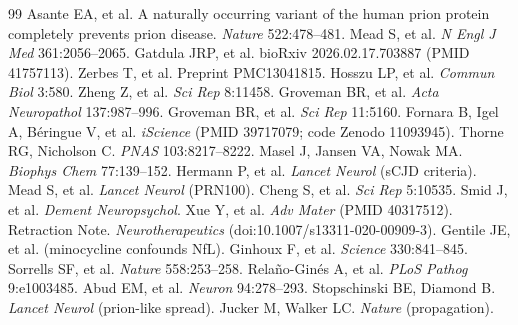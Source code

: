 \documentclass[10pt,twocolumn]{article}
\begin{document}
\begin{thebibliography}{99}\bibsep=1pt\tiny
{} Asante EA, et al. A naturally occurring variant of the human prion protein completely prevents prion disease. \emph{Nature} 522:478--481.
 Mead S, et al. \emph{N Engl J Med} 361:2056--2065.
 Gatdula JRP, et al. bioRxiv 2026.02.17.703887 (PMID 41757113).
 Zerbes T, et al. Preprint PMC13041815.
 Hosszu LP, et al. \emph{Commun Biol} 3:580.
 Zheng Z, et al. \emph{Sci Rep} 8:11458.
 Groveman BR, et al. \emph{Acta Neuropathol} 137:987--996.
 Groveman BR, et al. \emph{Sci Rep} 11:5160.
 Fornara B, Igel A, B\'eringue V, et al. \emph{iScience} (PMID 39717079; code Zenodo 11093945).
 Thorne RG, Nicholson C. \emph{PNAS} 103:8217--8222.
 Masel J, Jansen VA, Nowak MA. \emph{Biophys Chem} 77:139--152.
 Hermann P, et al. \emph{Lancet Neurol} (sCJD criteria).
 Mead S, et al. \emph{Lancet Neurol} (PRN100).
 Cheng S, et al. \emph{Sci Rep} 5:10535.
 Smid J, et al. \emph{Dement Neuropsychol}.
 Xue Y, et al. \emph{Adv Mater} (PMID 40317512).
 Retraction Note. \emph{Neurotherapeutics} (doi:10.1007/s13311-020-00909-3).
 Gentile JE, et al. (minocycline confounds NfL).
 Ginhoux F, et al. \emph{Science} 330:841--845.
 Sorrells SF, et al. \emph{Nature} 558:253--258.
 Rela\~no-Gin\'es A, et al. \emph{PLoS Pathog} 9:e1003485.
 Abud EM, et al. \emph{Neuron} 94:278--293.
 Stopschinski BE, Diamond B. \emph{Lancet Neurol} (prion-like spread).
 Jucker M, Walker LC. \emph{Nature} (propagation).
\end{thebibliography}
\end{document}
